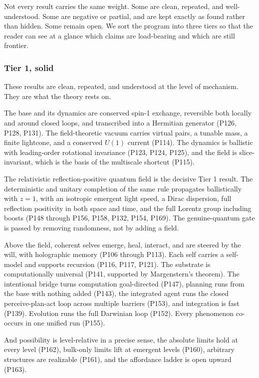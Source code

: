 Not every result carries the same weight. Some are clean, repeated, and well-understood. Some are negative or
partial, and are kept exactly as found rather than hidden. Some remain open. We sort the program into three
tiers so that the reader can see at a glance which claims are load-bearing and which are still frontier.

\subsubsection{Tier 1, solid}

These results are clean, repeated, and understood at the level of mechanism. They are what the theory rests
on.

The base and its dynamics are conserved spin-1 exchange, reversible both locally and around closed loops, and
transcribed into a Hermitian generator (P126, P128, P131). The field-theoretic vacuum carries virtual pairs, a
tunable mass, a finite lightcone, and a conserved $U(1)$ current (P114). The dynamics is ballistic with
leading-order rotational invariance (P123, P124, P125), and the field is slice-invariant, which is the basis
of the multiscale shortcut (P115).

The relativistic reflection-positive quantum field is the decisive Tier 1 result. The deterministic and
unitary completion of the same rule propagates ballistically with $z=1$, with an isotropic emergent light
speed, a Dirac dispersion, full reflection positivity in both space and time, and the full Lorentz group
including boosts (P148 through P156, P158, P132, P154, P169). The genuine-quantum gate is passed by removing
randomness, not by adding a field.

Above the field, coherent selves emerge, heal, interact, and are steered by the will, with holographic memory
(P106 through P113). Each self carries a self-model and supports recursion (P116, P117, P121). The substrate is
computationally universal (P141, supported by Margenstern's theorem). The intentional bridge turns computation
goal-directed (P147), planning runs from the base with nothing added (P143), the integrated agent runs the
closed perceive-plan-act loop across multiple barriers (P153), and integration is fast (P139). Evolution runs
the full Darwinian loop (P152). Every phenomenon co-occurs in one unified run (P155).

And possibility is
level-relative in a precise sense, the absolute limits hold at every level (P162), bulk-only limits lift at
emergent levels (P160), arbitrary structures are realizable (P161), and the affordance ladder is open upward
(P163).

